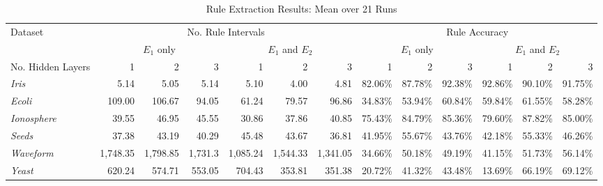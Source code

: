 \begin{table}[t!]
  \centering
  \begin{tabular}{|l|r|r|r|r|r|r|r|r|r|r|r|r|}
    \hline
    Dataset & 
    \multicolumn{6}{c|}{No. Rule Intervals} & 
    \multicolumn{6}{c|}{Rule Accuracy} \\
    \cline{2-13}
    & \multicolumn{3}{c|}{$E_1$ only} &
    \multicolumn{3}{c|}{$E_1$ and $E_2$} &
    \multicolumn{3}{c|}{$E_1$ only} &
    \multicolumn{3}{c|}{$E_1$ and $E_2$} \\
    \cline{2-13}
    \hline
    No. Hidden Layers & 1 & 2 & 3 & 1 & 2 & 3 & 1 & 2 & 3 & 1 & 2 & 3 \\
    \hline
    \textit{Iris} & 5.14 & 5.05 & 5.14 & 5.10 & 4.00 & 4.81 & 82.06\% &87.78\% & 92.38\% & 92.86\% & 90.10\% & 91.75\% \\
    \textit{Ecoli} & 109.00 & 106.67 & 94.05 &61.24 & 79.57 & 96.86 & 34.83\% & 53.94\% & 60.84\% & 59.84\% & 61.55\% & 58.28\% \\
    \textit{Ionosphere} & 39.55& 46.95& 45.55&30.86 & 37.86&
                                                             40.85&75.43\% & 84.79\%& 85.36\%&79.60\% & 87.82\%& 85.00\%\\
    \textit{Seeds} & 37.38 & 43.19 & 40.29 & 45.48 & 43.67 & 36.81 & 41.95\% & 55.67\% & 43.76\% & 42.18\% & 55.33\% & 46.26\% \\
    \textit{Waveform} & 1,748.35& 1,798.85 & 1,731.3 & 1,085.24 & 1,544.33 &
                                                                       1,341.05
                                  & 34.66\% & 50.18\%&49.19\% & 41.15\%&51.73\% & 56.14\%\\
    \textit{Yeast} &620.24 & 574.71& 553.05&704.43 & 353.81& 351.38&20.72\% & 41.32\%& 43.48\%&13.69\% &66.19\%&69.12\%\\
    \hline
  \end{tabular}
  \caption{Rule Extraction Results: Mean over 21 Runs}
  \label{tab:re_results}  
\end{table}

